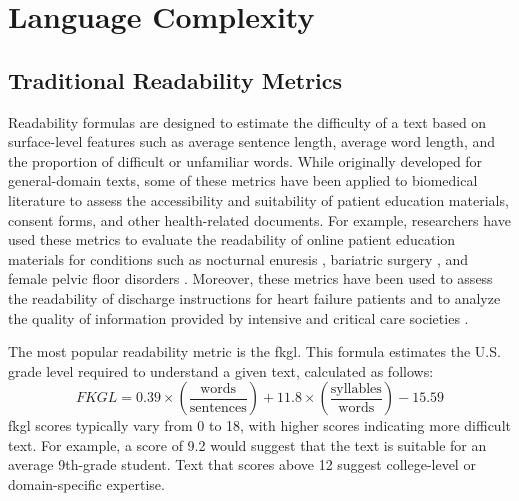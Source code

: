 \section{Language Complexity}
\label{c2:s:linguistic-complexity}

% 

\subsection{Traditional Readability Metrics}

Readability formulas are designed to estimate the difficulty of a text based on surface-level features such as average sentence length, average word length, and the proportion of difficult or unfamiliar words. While originally developed for general-domain texts, some of these metrics have been applied to biomedical literature to assess the accessibility and suitability of patient education materials, consent forms, and other health-related documents. For example, researchers have used these metrics to evaluate the readability of online patient education materials for conditions such as nocturnal enuresis \cite{Fung2024-uh}, bariatric surgery \cite{Lucy2023-zi}, and female pelvic floor disorders \cite{Varli2023-ma}. Moreover, these metrics have been used to assess the readability of discharge instructions for heart failure patients \cite{Tuan2023-wc} and to analyze the quality of information provided by intensive and critical care societies \cite{Hanci2024-wv}.

The most popular readability metric is the \gls{fkgl}. This formula estimates the U.S. grade level required to understand a given text, calculated as follows:
\begin{equation}
    \label{eq:fkgl}
    FKGL = 0.39 \times \left(\frac{\text{words}}{\text{sentences}}\right) + 11.8 \times \left(\frac{\text{syllables}}{\text{words}}\right) - 15.59
\end{equation}
\gls{fkgl} scores typically vary from 0 to 18, with higher scores indicating more difficult text. For example, a score of 9.2 would suggest that the text is suitable for an average 9th-grade student. Text that scores above 12 suggest college-level or domain-specific expertise.

